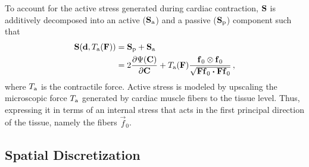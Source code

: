 To account for the active stress generated during cardiac contraction, $\S$ is additively decomposed into an active ($\S_\mathrm{a}$) and a passive ($\S_\mathrm{p}$) component such that
\begin{align}
    \S(\d, \Ta(\F)) &= \S_\mathrm{p} + \S_\mathrm{a} \label{eq:activeStress} \\
     &= 2 \frac{\partial \Psi(\C)}{\partial \C} + T_\text{a}(\F) \frac{\vec f_0 \otimes \vec f_0}{\sqrt{\vec F \vec f_0 \vdot \vec F \vec f_0}} \,, \nonumber
\end{align}
where $T_\mathrm{a}$ is the contractile force. 
Active stress is modeled by upscaling the microscopic force $T_\mathrm{a}$ generated by cardiac muscle fibers to the tissue level.
Thus, expressing it in terms of an internal stress that acts in the first principal direction of the tissue, namely the fibers $\vec f_0$.

\subsection{Spatial Discretization}

